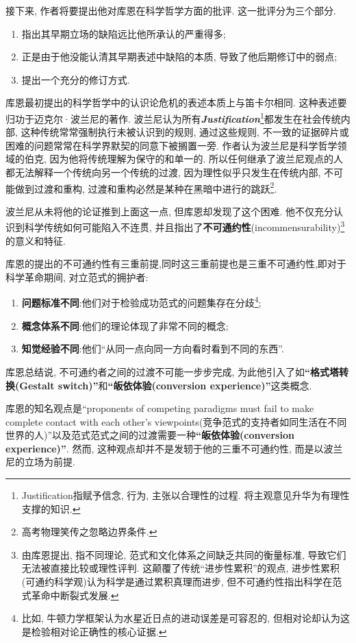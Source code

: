 \documentclass[12pt, a4paper, oneside]{ctexart}
\renewcommand{\b}{\textbf}
\newcommand{\f}{\footnote}
\begin{document}
接下来, 作者将要提出他对库恩在科学哲学方面的批评. 这一批评分为三个部分.
\begin{enumerate}
    \item 指出其早期立场的缺陷远比他所承认的严重得多; 
    \item 正是由于他没能认清其早期表述中缺陷的本质, 导致了他后期修订中的弱点; 
    \item 提出一个充分的修订方式.
\end{enumerate}

库恩最初提出的科学哲学中的认识论危机的表述本质上与笛卡尔相同. 这种表述要归功于迈克尔·波兰尼的著作. 波兰尼认为所有\textit{\b{Justification}}\f{Justification指赋予信念, 行为, 主张以合理性的过程. 将主观意见升华为有理性支撑的知识. }都发生在社会传统内部, 这种传统常常强制执行未被认识到的规则, 通过这些规则, 不一致的证据碎片或困难的问题常常在科学界默契的同意下被搁置一旁. 作者认为波兰尼是科学哲学领域的伯克, 因为他将传统理解为保守的和单一的. 所以任何继承了波兰尼观点的人都无法解释一个传统向另一个传统的过渡, 因为理性似乎只发生在传统内部, 不可能做到过渡和重构, 过渡和重构必然是某种在黑暗中进行的跳跃\f{高考物理笑传之忽略边界条件. }.

波兰尼从未将他的论证推到上面这一点, 但库恩却发现了这个困难. 他不仅充分认识到科学传统如何可能陷入不连贯, 并且指出了\b{不可通约性}(incommensurability)\f{由库恩提出, 指不同理论, 范式和文化体系之间缺乏共同的衡量标准, 导致它们无法被直接比较或理性评判. 这颠覆了传统``进步性累积''的观点, 进步性累积(可通约科学观)认为科学是通过累积真理而进步, 但不可通约性指出科学在范式革命中断裂式发展. }的意义和特征. 

库恩的提出的不可通约性有三重前提,同时这三重前提也是三重不可通约性,即对于科学革命期间, 对立范式的拥护者:
\begin{enumerate}
    \item \b{问题标准不同}:他们对于检验成功范式的问题集存在分歧\f{比如, 牛顿力学框架认为水星近日点的进动误差是可容忍的, 但相对论却认为这是检验相对论正确性的核心证据. };
    \item \b{概念体系不同}:他们的理论体现了非常不同的概念;
    \item \b{知觉经验不同}:他们``从同一点向同一方向看时看到不同的东西''.
\end{enumerate}
库恩总结说, 不可通约者之间的过渡不可能一步步完成, 为此他引入了如\b{``格式塔转换(Gestalt switch)''}和\b{``皈依体验(conversion experience)''}这类概念.

库恩的知名观点是``proponents of competing paradigms must fail to make complete contact with each other's viewpoints(竞争范式的支持者如同生活在不同世界的人)''以及范式范式之间的过渡需要一种\b{``皈依体验(conversion experience)''}. 然而, 这种观点却并不是发轫于他的三重不可通约性, 而是以波兰尼的立场为前提.
\end{document}

